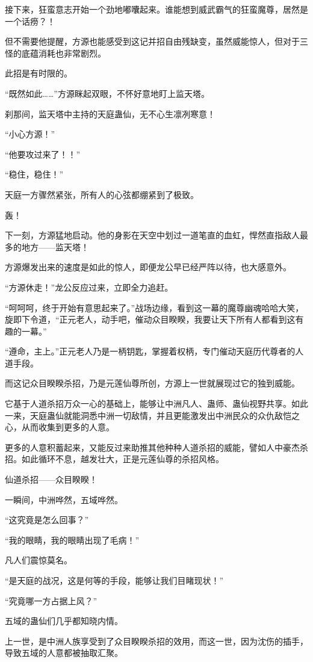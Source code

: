 \begin{this_body}
接下来，狂蛮意志开始一个劲地嘟囔起来。谁能想到威武霸气的狂蛮魔尊，居然是一个话痨？！

但不需要他提醒，方源也能感受到这记并招自由残缺变，虽然威能惊人，但对于三怪的底蕴消耗也非常剧烈。

此招是有时限的。

“既然如此……”方源眯起双眼，不怀好意地盯上监天塔。

刹那间，监天塔中主持的天庭蛊仙，无不心生凛冽寒意！

“小心方源！”

“他要攻过来了！！”

“稳住，稳住！”

天庭一方骤然紧张，所有人的心弦都绷紧到了极致。

轰！

下一刻，方源猛地启动。他的身影在天空中划过一道笔直的血虹，悍然直指敌人最多的地方——监天塔！

方源爆发出来的速度是如此的惊人，即便龙公早已经严阵以待，也大感意外。

“方源休走！”龙公反应过来，立即全力追赶。

“呵呵呵，终于开始有意思起来了。”战场边缘，看到这一幕的魔尊幽魂哈哈大笑，旋即下令道，“正元老人，动手吧，催动众目睽睽，我要让天下所有人都看到这有趣的一幕。”

“遵命，主上。”正元老人乃是一柄钥匙，掌握着权柄，专门催动天庭历代尊者的人道手段。

而这记众目睽睽杀招，乃是元莲仙尊所创，方源上一世就展现过它的独到威能。

它基于人道杀招万众一心的基础上，能够让中洲凡人、蛊师、蛊仙视野共享。如此一来，天庭蛊仙就能洞悉中洲一切敌情，并且更能激发出中洲民众的众仇敌恺之心，从而收集到更多的人意。

更多的人意积蓄起来，又能反过来助推其他种种人道杀招的威能，譬如人中豪杰杀招。如此循环不息，越发壮大，正是元莲仙尊的杀招风格。

仙道杀招——众目睽睽！

一瞬间，中洲哗然，五域哗然。

“这究竟是怎么回事？”

“我的眼睛，我的眼睛出现了毛病！”

凡人们震惊莫名。

“是天庭的战况，这是何等的手段，能够让我们目睹现状！”

“究竟哪一方占据上风？”

五域的蛊仙们几乎都知晓内情。

上一世，是中洲人族享受到了众目睽睽杀招的效用，而这一世，因为沈伤的插手，导致五域的人意都被抽取汇聚。


\end{this_body}
